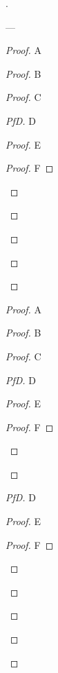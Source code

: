\documentclass{article}
\begin{document}
    .

    \FooT

    \FooA

    \BearT

    \BearA

    ---

    \begin{proof}
        A
        \begin{proof}
            B
            \begin{proof}
                C
                \begin{proof}[PfD]
                    D
                    \begin{proof}
                        E
                        \begin{proof}
                            F
                        \end{proof}
                    \end{proof}
                \end{proof}
            \end{proof}
        \end{proof}
    \end{proof}
    \begin{proof}
        A
        \begin{proof}
            B
            \begin{proof}
                C
                \begin{proof}[PfD]
                    D
                    \begin{proof}
                        E
                        \begin{proof}
                            F
                        \end{proof}
                    \end{proof}
                \end{proof}
                \begin{proof}[PfD]
                    D
                    \begin{proof}
                        E
                        \begin{proof}
                            F
                        \end{proof}
                    \end{proof}
                \end{proof}
            \end{proof}
        \end{proof}
    \end{proof}
\end{document}
